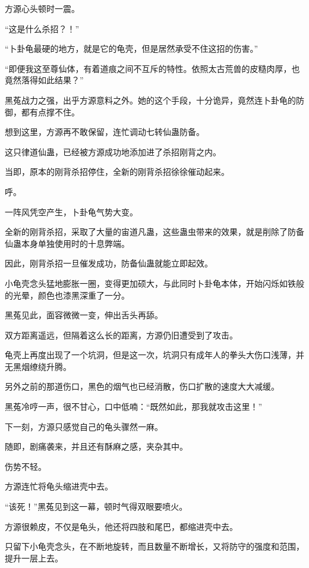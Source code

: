 
\begin{this_body}



方源心头顿时一震。

“这是什么杀招？！”

“卜卦龟最硬的地方，就是它的龟壳，但是居然承受不住这招的伤害。”

“即便我这至尊仙体，有着道痕之间不互斥的特性。依照太古荒兽的皮糙肉厚，也竟然落得如此结果？”

黑菟战力之强，出乎方源意料之外。她的这个手段，十分诡异，竟然连卜卦龟的防御，都有点撑不住。

想到这里，方源再不敢保留，连忙调动七转仙蛊防备。

这只律道仙蛊，已经被方源成功地添加进了杀招刚背之内。

当即，原本的刚背杀招停住，全新的刚背杀招徐徐催动起来。

呼。

一阵风凭空产生，卜卦龟气势大变。

全新的刚背杀招，采取了大量的宙道凡蛊，这些蛊虫带来的效果，就是削除了防备仙蛊本身单独使用时的十息弊端。

因此，刚背杀招一旦催发成功，防备仙蛊就能立即起效。

小龟壳念头猛地膨胀一圈，变得更加硕大，与此同时卜卦龟本体，开始闪烁如铁般的光晕，颜色也漆黑深重了一分。

黑菟见此，面容微微一变，伸出舌头再舔。

双方距离遥远，但隔着这么长的距离，方源仍旧遭受到了攻击。

龟壳上再度出现了一个坑洞，但是这一次，坑洞只有成年人的拳头大伤口浅薄，并无黑烟缭绕升腾。

另外之前的那道伤口，黑色的烟气也已经消散，伤口扩散的速度大大减缓。

黑菟冷哼一声，很不甘心，口中低喃：“既然如此，那我就攻击这里！”

下一刻，方源只感觉自己的龟头骤然一麻。

随即，剧痛袭来，并且还有酥麻之感，夹杂其中。

伤势不轻。

方源连忙将龟头缩进壳中去。

“该死！”黑菟见到这一幕，顿时气得双眼要喷火。

方源很赖皮，不仅是龟头，他还将四肢和尾巴，都缩进壳中去。

只留下小龟壳念头，在不断地旋转，而且数量不断增长，又将防守的强度和范围，提升一层上去。


\end{this_body}
